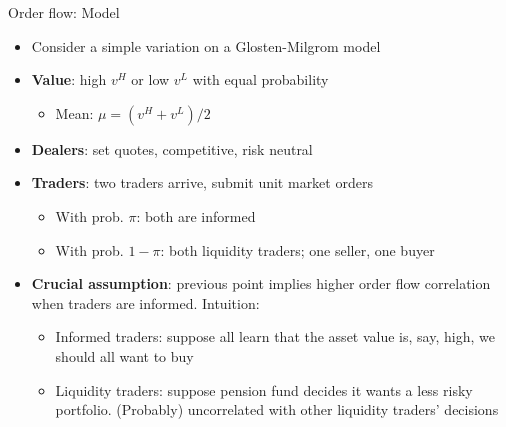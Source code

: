 \documentclass[english,10pt
,aspectratio=169
]{beamer}
\begin{document}
\begin{frame}{Order flow: Model}
	\begin{itemize}
		\item Consider a simple variation on a Glosten-Milgrom model
		\item \textbf{Value}: high $v^H$ or low $v^L$ with equal probability
		\begin{itemize}
			\item Mean: $\mu=(v^H+v^L)/2$
		\end{itemize}
		\item \textbf{Dealers}: set quotes, competitive, risk neutral
		\item \textbf{Traders}: two traders arrive, submit unit market orders
		\begin{itemize}
			\item With prob. $\pi$: both are informed
			\item With prob. $1-\pi$: both liquidity traders;  one seller, one buyer
		\end{itemize}
		\item \textbf{Crucial assumption}: previous point implies higher order flow correlation  when traders are informed. Intuition: 
		\begin{itemize}
			\item Informed traders: suppose all learn that the asset value is, say, high, we should all want to buy
			\item Liquidity traders: suppose pension fund decides it wants a less risky portfolio. (Probably) uncorrelated with other liquidity traders' decisions
		\end{itemize}
	\end{itemize}
\end{frame}
\end{document}
